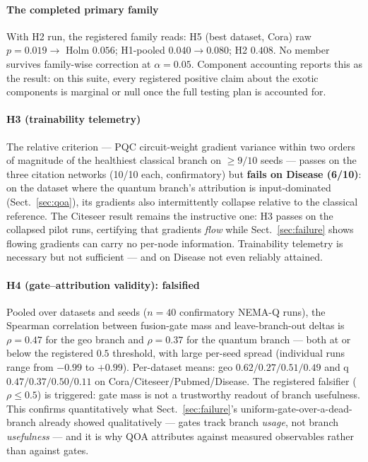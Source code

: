 \documentclass[pdflatex,sn-mathphys-num]{sn-jnl}
\begin{document}
\paragraph{The completed primary family} With H2 run, the registered family reads: H5 (best dataset, Cora) raw $p=0.019 \to$ Holm $0.056$; H1-pooled $0.040 \to 0.080$; H2 $0.408$. No member survives family-wise correction at $\alpha=0.05$. Component accounting reports this as the result: on this suite, every registered positive claim about the exotic components is marginal or null once the full testing plan is accounted for.

\paragraph{H3 (trainability telemetry)} The relative criterion --- PQC circuit-weight gradient variance within two orders of magnitude of the healthiest classical branch on $\ge 9/10$ seeds --- passes on the three citation networks (10/10 each, confirmatory) but \textbf{fails on Disease (6/10)}: on the dataset where the quantum branch's attribution is input-dominated (Sect.~\ref{sec:qoa}), its gradients also intermittently collapse relative to the classical reference. The Citeseer result remains the instructive one: H3 passes on the collapsed pilot runs, certifying that gradients \emph{flow} while Sect.~\ref{sec:failure} shows flowing gradients can carry no per-node information. Trainability telemetry is necessary but not sufficient --- and on Disease not even reliably attained.

\paragraph{H4 (gate--attribution validity): falsified} Pooled over datasets and seeds ($n=40$ confirmatory NEMA-Q runs), the Spearman correlation between fusion-gate mass and leave-branch-out deltas is $\rho=0.47$ for the geo branch and $\rho=0.37$ for the quantum branch --- both at or below the registered $0.5$ threshold, with large per-seed spread (individual runs range from $-0.99$ to $+0.99$). Per-dataset means: geo $0.62/0.27/0.51/0.49$ and q $0.47/0.37/0.50/0.11$ on Cora/Citeseer/Pubmed/Disease. The registered falsifier ($\rho \le 0.5$) is triggered: gate mass is not a trustworthy readout of branch usefulness. This confirms quantitatively what Sect.~\ref{sec:failure}'s uniform-gate-over-a-dead-branch already showed qualitatively --- gates track branch \emph{usage}, not branch \emph{usefulness} --- and it is why QOA attributes against measured observables rather than against gates.
\end{document}
